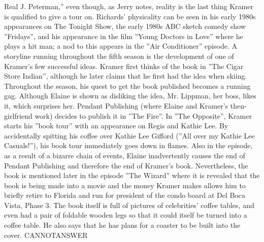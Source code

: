 \documentclass[11pt,a4paper, onecolumn]{article}
\begin{document}
Real J. Peterman,'' even though, as Jerry notes, reality is the last thing Kramer is qualified to give a tour on. Richards' physicality can be seen in his early 1980s appearances on The Tonight Show, the early 1980s ABC sketch comedy show ''Fridays'', and his appearance in the film ''Young Doctors in Love'' where he plays a hit man; a nod to this appears in the ''Air Conditioner'' episode. A storyline running throughout the fifth season is the development of one of Kramer's few successful ideas. Kramer first thinks of the book in ''The Cigar Store Indian'', although he later claims that he first had the idea when skiing. Throughout the season, his quest to get the book published becomes a running gag. Although Elaine is shown as disliking the idea, Mr. Lippman, her boss, likes it, which surprises her. Pendant Publishing (where Elaine and Kramer's then-girlfriend work) decides to publish it in ''The Fire''. In ''The Opposite'', Kramer starts his ''book tour'' with an appearance on Regis and Kathie Lee. By accidentally spitting his coffee over Kathie Lee Gifford (''All over my Kathie Lee Casuals!''), his book tour immediately goes down in flames. Also in the episode, as a result of a bizarre chain of events, Elaine inadvertently causes the end of Pendant Publishing and therefore the end of Kramer's book. Nevertheless, the book is mentioned later in the episode ''The Wizard'' where it is revealed that the book is being made into a movie and the money Kramer makes allows him to briefly retire to Florida and run for president of the condo board at Del Boca Vista, Phase 3. The book itself is full of pictures of celebrities' coffee tables, and even had a pair of foldable wooden legs so that it could itself be turned into a coffee table. He also says that he has plans for a coaster to be built into the cover. CANNOTANSWER
\end{document}
